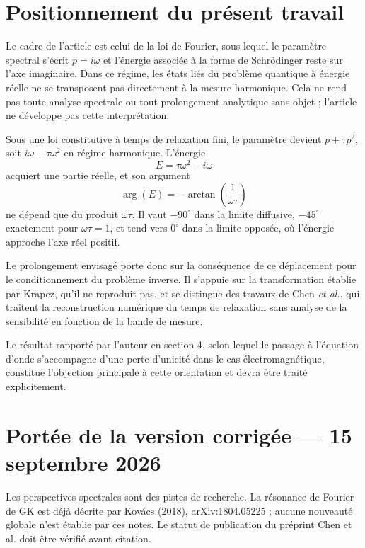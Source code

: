 \documentclass[11pt,a4paper]{article}
\begin{document}
\section{Positionnement du présent travail}

Le cadre de l'article est celui de la loi de Fourier, sous lequel le paramètre spectral s'écrit
$p = i\omega$ et l'énergie associée à la forme de Schrödinger reste sur l'axe imaginaire. Dans ce
régime, les états liés du problème quantique à énergie réelle ne se transposent pas
directement à la mesure harmonique. Cela ne rend pas toute analyse spectrale ou
tout prolongement analytique sans objet ; l'article ne développe pas cette interprétation.

Sous une loi constitutive à temps de relaxation fini, le paramètre devient $p + \tau p^{2}$, soit
$i\omega - \tau\omega^{2}$ en régime harmonique. L'énergie
\[ E = \tau\omega^{2} - i\omega \]
acquiert une partie réelle, et son argument
\[ \arg(E) = -\arctan\!\left(\frac{1}{\omega\tau}\right) \]
ne dépend que du produit $\omega\tau$. Il vaut $-90^{\circ}$ dans la limite diffusive, $-45^{\circ}$
exactement pour $\omega\tau = 1$, et tend vers $0^{\circ}$ dans la limite opposée, où l'énergie approche
l'axe réel positif.

Le prolongement envisagé porte donc sur la conséquence de ce déplacement pour le conditionnement du
problème inverse. Il s'appuie sur la transformation établie par Krapez, qu'il ne reproduit pas, et se
distingue des travaux de Chen \emph{et al.}, qui traitent la reconstruction numérique du temps de
relaxation sans analyse de la sensibilité en fonction de la bande de mesure.

Le résultat rapporté par l'auteur en section 4, selon lequel le passage à l'équation d'onde
s'accompagne d'une perte d'unicité dans le cas électromagnétique, constitue l'objection principale à
cette orientation et devra être traité explicitement.
\section*{Portée de la version corrigée --- 15 septembre 2026}
Les perspectives spectrales sont des pistes de recherche. La résonance de Fourier de GK est déjà décrite par Kovács (2018), arXiv:1804.05225 ; aucune nouveauté globale n'est établie par ces notes. Le statut de publication du préprint Chen et al. doit être vérifié avant citation.
\end{document}
